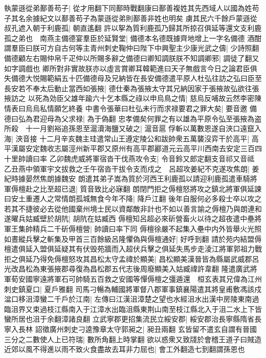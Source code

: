 執蒙遜從弟鄯善苟子|{
	從才用翻下同鄯時戰翻康曰鄯善複姓其先西域人以國為姓苟子其名余據紀文以鄯善苟子為蒙遜從弟則鄯善非姓也明矣}
虜其民六千餘戶蒙遜從叔孔遮入朝于利鹿孤|{
	朝直遙翻}
許以挐為質利鹿孤乃歸其所掠召俱延等還文支利鹿孤之弟也　南燕主備德宴羣臣於延賢堂|{
	備德本名德既據齊地增上一字名備德}
酒酣謂羣臣曰朕可方自古何等主青州刺史鞠仲曰陛下中興聖主少康光武之儔|{
	少詩照翻}
備德顧左右賜仲帛千疋仲以所賜多辭之備德曰卿知調朕朕不知調卿邪|{
	調徒了翻又如字調戲也}
卿所對非實故朕亦以虛言賞卿耳韓範進曰天子無戲言今日之論君臣俱失備德大悦賜範絹五十匹備德母及兄納皆在長安備德遣平原人杜弘往訪之弘曰臣至長安若不奉太后動止當西如張掖|{
	德仕秦為張掖太守其兄納因家于張掖故弘欲往張掖訪之}
以死為効臣父雄年踰六十乞本縣之祿以申烏鳥之情|{
	慈烏反哺故云然李密陳情表曰烏烏私情願乞終養}
中書令張華曰杜弘未行而求禄要君之罪大矣|{
	要音邀}
備德曰弘為君迎母為父求禄|{
	為于偽翻}
忠孝備矣何罪之有以雄為平原令弘至張掖為盗所殺　十一月劉裕追孫恩至滬瀆海鹽又破之|{
	滬音扈}
俘斬以萬數恩遂自浹口遠竄入海|{
	浹音接}
十二月辛亥魏主珪遣常山王遵定陵公和跋帥衆五萬襲沒弈干於高平|{
	高平漢屬安定魏收志屬涇州新平郡又原州有高平郡酈道元云高平川西南去安定三百四十里帥讀曰率}
乙卯魏虎威將軍宿沓干伐燕攻令支|{
	令音鈴又郎定翻支音祁又音祗}
乙丑燕中領軍宇文拔救之壬午宿沓干拔令支而戍之　呂超攻姜紀不克遂攻焦朗|{
	姜紀時據晏然焦朗據魏安}
朗遣其弟子嵩為質於河西王利鹿孤以請迎利鹿孤遣車騎將軍傉檀赴之比至超已退|{
	質音致比必寐翻}
朗閉門拒之傉檀怒將攻之鎮北將軍俱延諫曰安土重遷人之常情朗孤城無食今年不降|{
	降戶江翻}
後年自服何必多殺士卒以攻之若其不捷彼必去從他國棄州境士民以資鄰敵非計也不如以善言諭之傉檀乃與朗連和遂曜兵姑臧壁於胡阬|{
	胡阬在姑臧西}
傉檀知呂超必來斫營畜火以待之超夜遣中壘將軍王集帥精兵二千斫傉檀營|{
	帥讀曰率下同}
傉檀徐嚴不起集入壘中内外皆舉火光照如晝縱兵擊之斬集及甲首三百餘級呂隆懼偽與傉檀通好|{
	好呼到翻}
請於苑内結盟傉檀遣俱延入盟俱延疑其有伏毁苑牆而入超伏兵擊之俱延失馬步走淩江將軍郭祖力戰拒之俱延乃得免傉檀怒攻其昌松太守孟禕於顯美|{
	昌松顯美漢晉皆為縣屬武威郡呂光改昌松為東張掖郡尋復為昌松郡五代志後周廢顯美入姑臧禕許韋翻}
隆遣廣武將軍荀安國寧遠將軍石可帥騎五百救之安國等憚傉檀之彊遁還　桓玄表其兄偉為江州刺史鎮夏口|{
	夏戶雅翻}
司馬刁暢為輔國將軍督八郡軍事鎮襄陽遣其將皇甫敷馮該戍湓口移沮漳蠻二千戶於江南|{
	左傳曰江漢沮漳楚之望也水經沮水出漢中房陵東南過臨沮界又束過枝江縣南入于江漳水出臨沮縣東荆山南至枝江縣北入于沮二水上下皆蠻所居也沮于余翻漳諸良翻}
立武寧郡更招集流民立綏安郡|{
	綏安郡治長寧縣隋省長寧入長林}
詔徵廣州刺史刁逵豫章太守郭昶之|{
	昶丑兩翻}
玄皆留不遣玄自謂有晉國三分之二數使人上已符瑞|{
	數所角翻上時掌翻}
欲以惑衆又致牋於會稽王道子曰賊造近郊以風不得進以雨不致火食盡故去耳非力屈也|{
	會工外翻造七到翻謂孫恩也}
